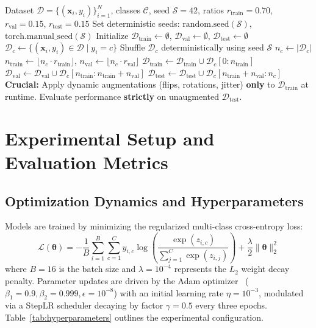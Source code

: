 \documentclass[11pt,a4paper]{article}
\begin{document}
\begin{algorithm}[!h]
\caption{Stratified Partitioning and Leakage-Free Training}
\label{alg:splitting}
\begin{algorithmic}[1]
\Require Dataset $\mathcal{D} = \{(\mathbf{x}_i, y_i)\}_{i=1}^N$, classes $\mathcal{C}$, seed $\mathcal{S}=42$, ratios $r_{\text{train}}=0.70$, $r_{\text{val}}=0.15$, $r_{\text{test}}=0.15$
\State Set deterministic seeds: $\text{random.seed}(\mathcal{S})$, $\text{torch.manual\_seed}(\mathcal{S})$
\State Initialize $\mathcal{D}_{\text{train}} \gets \emptyset$, $\mathcal{D}_{\text{val}} \gets \emptyset$, $\mathcal{D}_{\text{test}} \gets \emptyset$
    \State $\mathcal{D}_c \gets \{(\mathbf{x}_i, y_i) \in \mathcal{D} \mid y_i = c\}$
    \State Shuffle $\mathcal{D}_c$ deterministically using seed $\mathcal{S}$
    \State $n_c \gets |\mathcal{D}_c|$
    \State $n_{\text{train}} \gets \lfloor n_c \cdot r_{\text{train}} \rfloor$, $n_{\text{val}} \gets \lfloor n_c \cdot r_{\text{val}} \rfloor$
    \State $\mathcal{D}_{\text{train}} \gets \mathcal{D}_{\text{train}} \cup \mathcal{D}_c[0 : n_{\text{train}}]$
    \State $\mathcal{D}_{\text{val}} \gets \mathcal{D}_{\text{val}} \cup \mathcal{D}_c[n_{\text{train}} : n_{\text{train}} + n_{\text{val}}]$
    \State $\mathcal{D}_{\text{test}} \gets \mathcal{D}_{\text{test}} \cup \mathcal{D}_c[n_{\text{train}} + n_{\text{val}} : n_c]$
\EndFor
\State \textbf{Crucial:} Apply dynamic augmentations (flips, rotations, jitter) \textbf{only} to $\mathcal{D}_{\text{train}}$ at runtime.
\State Evaluate performance \textbf{strictly} on unaugmented $\mathcal{D}_{\text{test}}$.
\end{algorithmic}
\end{algorithm}

\section{Experimental Setup and Evaluation Metrics}

\subsection{Optimization Dynamics and Hyperparameters}
Models are trained by minimizing the regularized multi-class cross-entropy loss:
\begin{equation}
\mathcal{L}(\boldsymbol{\theta}) = -\frac{1}{B} \sum_{i=1}^{B} \sum_{c=1}^{C} y_{i, c} \log\left(\frac{\exp(z_{i, c})}{\sum_{j=1}^C \exp(z_{i, j})}\right) + \frac{\lambda}{2} \|\boldsymbol{\theta}\|_2^2
\label{eq:reg_loss}
\end{equation}
where $B=16$ is the batch size and $\lambda = 10^{-4}$ represents the $L_2$ weight decay penalty. Parameter updates are driven by the Adam optimizer~\cite{kingma2014adam} ($\beta_1 = 0.9, \beta_2 = 0.999, \epsilon = 10^{-8}$) with an initial learning rate $\eta = 10^{-3}$, modulated via a StepLR scheduler decaying by factor $\gamma = 0.5$ every three epochs. Table~\ref{tab:hyperparameters} outlines the experimental configuration.
\end{document}
